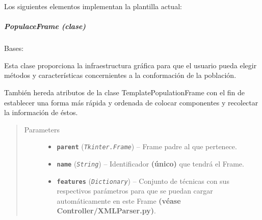 \documentclass[letterpaper,10pt,english]{sphinxmanual}
\begin{document}
Los siguientes elementos implementan la plantilla actual:


\subparagraph{PopulaceFrame (clase)}
\label{View/Main/Population/TemplatePopulation/PopulaceFrame:populaceframe-clase}\label{View/Main/Population/TemplatePopulation/PopulaceFrame::doc}\label{View/Main/Population/TemplatePopulation/PopulaceFrame:module-View.Main.Population.PopulaceFrame}

\begin{fulllineitems}
\label{View/Main/Population/TemplatePopulation/PopulaceFrame:View.Main.Population.PopulaceFrame.PopulaceFrame}
Bases: {\hyperref[View/Main/Population/TemplatePopulation/TemplatePopulationFrame:View.Main.Population.TemplatePopulation.TemplatePopulationFrame.TemplatePopulationFrame]{}}

\begin{DUlineblock}{0em}
\item[] Esta clase proporciona la infraestructura gráfica para que el usuario pueda 
elegir métodos y características concernientes a la conformación de la población.
\item[] También hereda atributos de la clase TemplatePopulationFrame con el fin de 
establecer una forma más rápida y ordenada de colocar componentes y recolectar
la información de éstos.
\end{DUlineblock}
\begin{quote}\begin{description}
\item[{Parameters}] \leavevmode\begin{itemize}
\item {} 
\textbf{\texttt{parent}} (\emph{\texttt{Tkinter.Frame}}) -- Frame padre al que pertenece.

\item {} 
\textbf{\texttt{name}} (\emph{\texttt{String}}) -- Identificador \textbf{(único)} que tendrá el Frame.

\item {} 
\textbf{\texttt{features}} (\emph{\texttt{Dictionary}}) -- Conjunto de técnicas con sus respectivos parámetros para que
se puedan cargar automáticamente en este Frame \textbf{(véase
Controller/XMLParser.py)}.


\end{itemize}
\end{description}
\end{quote}
\end{fulllineitems}
\end{document}
